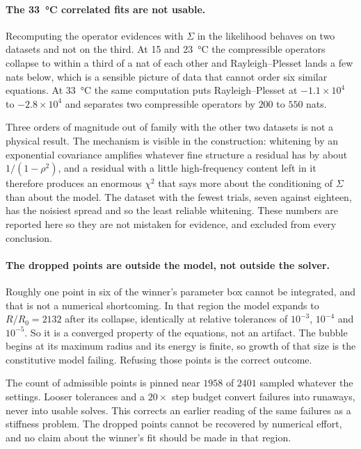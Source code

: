 \documentclass[10pt]{article}
\begin{document}
\paragraph{The \SI{33}{\celsius} correlated fits are not usable.}
\label{sec:33anomaly}
Recomputing the operator evidences with $\Sigma$ in the likelihood behaves on two datasets and
not on the third. At \SI{15}{} and \SI{23}{\celsius} the compressible operators collapse to
within a third of a nat of each other and Rayleigh--Plesset lands a few nats below, which is a
sensible picture of data that cannot order six similar equations. At \SI{33}{\celsius} the same
computation puts Rayleigh--Plesset at $-1.1\times10^{4}$ to $-2.8\times10^{4}$ and separates two
compressible operators by $200$ to $550$ nats.

Three orders of magnitude out of family with the other two datasets is not a physical result. The
mechanism is visible in the construction: whitening by an exponential covariance amplifies
whatever fine structure a residual has by about $1/(1-\rho^2)$, and a residual with a little
high-frequency content left in it therefore produces an enormous $\chi^2$ that says more about
the conditioning of $\Sigma$ than about the model. The dataset with the fewest trials, seven
against eighteen, has the noisiest spread and so the least reliable whitening. These numbers
are reported here so they are not mistaken for evidence, and excluded from every conclusion.

\paragraph{The dropped points are outside the model, not outside the solver.}
Roughly one point in six of the winner's parameter box cannot be integrated, and that is not
a numerical shortcoming. In that region the model expands to $R/R_0 = 2132$ after its collapse, identically at relative tolerances of $10^{-3}$, $10^{-4}$ and $10^{-5}$. So it is a
converged property of the equations, not an artifact. The bubble begins at its maximum radius
and its energy is finite, so growth of that size is the constitutive model failing. Refusing
those points is the correct outcome.

The count of admissible points is pinned near $1958$ of $2401$ sampled whatever the settings.
Looser tolerances and a $20\times$ step budget convert failures into runaways, never into
usable solves. This corrects an earlier reading of the same failures as a stiffness problem.
The dropped points cannot be recovered by numerical effort, and no claim about the winner's
fit should be made in that region.
\end{document}
